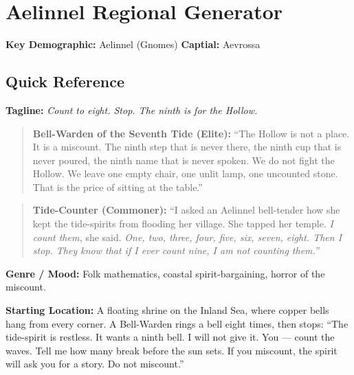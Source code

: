 \section{Aelinnel Regional Generator}
\label{chap:aelinnel}

\textbf{Key Demographic: } Aelinnel (Gnomes)
\textbf{Captial: } Aevrossa

\subsection*{Quick Reference}
\textbf{Tagline:} \textit{Count to eight. Stop. The ninth is for the Hollow.}

\begin{quote}
  \textbf{Bell-Warden of the Seventh Tide (Elite):}  
  ``The Hollow is not a place. It is a miscount. The ninth step that is never there, the ninth cup that is never poured, the ninth name that is never spoken. We do not fight the Hollow. We leave one empty chair, one unlit lamp, one uncounted stone. That is the price of sitting at the table.''
\end{quote}

\begin{quote}
  \textbf{Tide-Counter (Commoner):}  
  ``I asked an Aelinnel bell-tender how she kept the tide-spirits from flooding her village. She tapped her temple. \textit{I count them,} she said. \textit{One, two, three, four, five, six, seven, eight. Then I stop. They know that if I ever count nine, I am not counting them.''}
\end{quote}

\textbf{Genre / Mood:} Folk mathematics, coastal spirit-bargaining, horror of the miscount.

\textbf{Starting Location:} A floating shrine on the Inland Sea, where copper bells hang from every corner. A Bell-Warden rings a bell eight times, then stops: ``The tide-spirit is restless. It wants a ninth bell. I will not give it. You --- count the waves. Tell me how many break before the sun sets. If you miscount, the spirit will ask you for a story. Do not miscount.''

